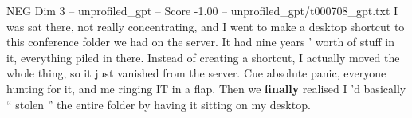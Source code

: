 \begin{textsample}{NEG Dim 3 – unprofiled\_gpt – Score -1.00 – unprofiled\_gpt/t000708\_gpt.txt}  \label{ex:f3_neg_019}
I was sat there, not really concentrating, and I went to make a desktop shortcut to this conference folder we had on the server.
It had nine years ’ worth of stuff in it, everything piled in there.
Instead of creating a shortcut, I actually moved the whole thing, so it just vanished from the server.
Cue absolute panic, everyone hunting for it, and me ringing IT in a flap.
Then we \textbf{finally} realised I ’d basically “ stolen ” the entire folder by having it sitting on my desktop.

\end{textsample}
